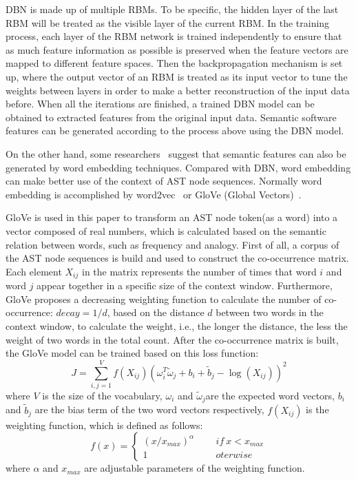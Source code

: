 \documentclass[journal]{IEEEtran}
\begin{document}
DBN is made up of multiple RBMs. To be specific, the hidden layer of the last RBM will be treated as the visible layer of the current RBM. In the training process, each layer of the RBM network is trained independently to ensure that as much feature information as possible is preserved when the feature vectors are mapped to different feature spaces. Then the backpropagation mechanism is set up, where the output vector of an RBM is treated as its input vector to tune the weights between layers in order to make a better reconstruction of the input data before. When all the iterations are finished, a trained DBN model can be obtained to extracted features from the original input data. Semantic software features can be generated according to the process above using the DBN model.

On the other hand, some researchers~\cite{fan2019deep,li2017software} suggest that semantic features can also be generated by word embedding techniques. Compared with DBN, word embedding can make better use of the context of AST node sequences. Normally word embedding is accomplished by word2vec~\cite{mikolov2013distributed} or GloVe (Global Vectors)~\cite{pennington2014glove}.


GloVe is used in this paper to transform an AST node token(as a word) into a vector composed of real numbers, which is calculated based on the semantic relation between words, such as frequency and analogy. First of all, a corpus of the AST node sequences is build and used to construct the co-occurrence matrix. Each element $X_{ij}$ in the matrix represents the number of times that word $i$ and word $j$ appear together in a specific size of the context window. Furthermore, GloVe proposes a decreasing weighting function to calculate the number of co-occurrence: $decay=1/d$, based on the distance $d$ between two words in the context window, to calculate the weight, i.e., the longer the distance, the less the weight of two words in the total count. After the co-occurrence matrix is built, the GloVe model can be trained based on this loss function:
\begin{equation}
J=\sum_{i,j=1}^{V}f(X_{ij})(\omega_{i}^{T} \tilde{\omega}_{j}+b_{i}+\tilde{b}_{j}-\log(X_{ij}))^{2}
\end{equation}
where $V$ is the size of the vocabulary, $\omega_{i}$ and $\tilde{\omega}_{j}$are the expected word vectors, $b_{i}$ and $\tilde{b}_{j}$ are the bias term of the two word vectors respectively, $f(X_{ij})$ is the weighting function, which is defined as follows:
\begin{equation}
f(x)=
\begin{cases}
(x/x_{max})^{\alpha}\quad \ \ & if\ x<x_{max}\\
1\quad \ \ & oterwise
\end{cases}
\end{equation}
where $\alpha$ and $x_{max}$ are adjustable parameters of the weighting function.
\end{document}
